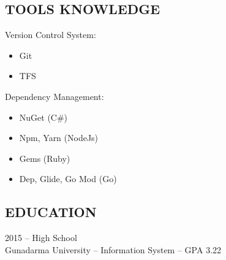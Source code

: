 \documentclass[11pt,a4paper,english]{article}
\begin{document}
\subsection*{TOOLS KNOWLEDGE}
Version Control System:
\begin{itemize}
	\item Git
	\item TFS
\end{itemize}

\noindent Dependency Management:
\begin{itemize}
	\item NuGet (C\#)
	\item Npm, Yarn (NodeJs)
	\item Gems (Ruby)
	\item Dep, Glide, Go Mod (Go)
\end{itemize}


\subsection*{EDUCATION}
\begin{description}
	\item 2015 -- High School\hfill\\Gunadarma University -- Information System -- GPA 3.22
\end{description}
\end{document}
